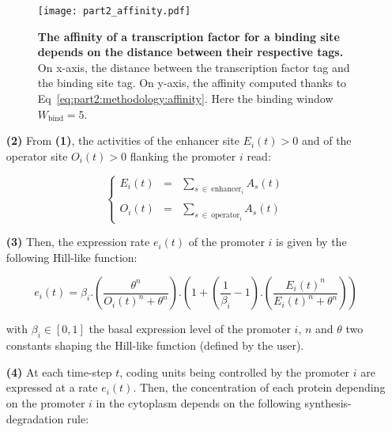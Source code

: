 \begin{enumerate}
\begin{figure}[!ht]
\centering 
\texttt{[image: part2\_affinity.pdf]}
\caption[The affinity of a transcription factor for a binding site depends on the distance between their respective tags.]{\textbf{The affinity of a transcription factor for a binding site depends on the distance between their respective tags.} On x-axis, the distance between the transcription factor tag and the binding site tag. On y-axis, the affinity computed thanks to Eq~\ref{eq:part2:methodology:affinity}. Here the binding window $W_\text{bind} = 5$.}
\label{fig:part2:methodology:affinity}
\end{figure}

\item[\textbf{(2)}] From \textbf{(1)}, the activities of the enhancer site $E_i(t) > 0$ and of the operator site $O_i(t) > 0$ flanking the promoter $i$ read:

\begin{equation}
\label{eq:part2:methodology:enhancer_operator_activity}
\left\{
\begin{array}{rcl}
E_i(t) & = & \sum\limits_{s\ \in\ \text{enhancer}_i} A_s(t)\\\\
O_i(t) & = & \sum\limits_{s\ \in\ \text{operator}_i} A_s(t)
\end{array}
\right.
\end{equation}

\item[\textbf{(3)}] Then, the expression rate $e_i(t)$ of the promoter $i$ is given by the following Hill-like function:

\begin{equation}
\label{eq:part2:methodology:hill_function}
e_i(t) = \beta_i . \left( \dfrac{\theta^n}{O_i(t)^n + \theta^n} \right) . \left( 1 + \left( \dfrac{1}{\beta_i} - 1 \right) . \left( \dfrac{E_i(t)^n}{E_i(t)^n + \theta^n} \right) \right)
\end{equation}

with $\beta_i \in [0, 1]$ the basal expression level of the promoter $i$, $n$ and $\theta$ two constants shaping the Hill-like function (defined by the user).

\item[\textbf{(4)}] At each time-step $t$, coding units being controlled by the promoter $i$ are expressed at a rate $e_i(t)$. Then, the concentration of each protein depending on the promoter $i$ in the cytoplasm depends on the following synthesis-degradation rule:


\end{enumerate}
